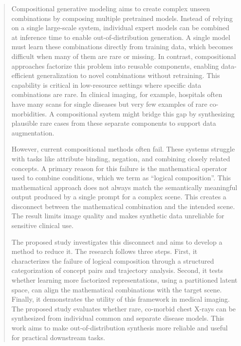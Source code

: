 
\begin{abstract}
Compositional generative modeling aims to create complex unseen combinations by composing multiple pretrained models. 
Instead of relying on a single large-scale system, individual expert models can be combined at inference time to enable out-of-distribution generation. 
A single model must learn these combinations directly from training data, which becomes difficult when many of them are rare or missing.
In contrast, compositional approaches factorize this problem into reusable components, enabling data-efficient generalization to novel combinations without retraining.
This capability is critical in low-resource settings where specific data combinations are rare. 
In clinical imaging, for example, hospitals often have many scans for single diseases but very few examples of rare co-morbidities. 
A compositional system might bridge this gap by synthesizing plausible rare cases from these separate components to support data augmentation.

However, current compositional methods often fail. 
These systems struggle with tasks like attribute binding, negation, and combining closely related concepts. 
A primary reason for this failure is the mathematical operator used to combine conditions, which we term as ``logical composition''. 
This mathematical approach does not always match the semantically meaningful output produced by a single prompt for a complex scene. 
This creates a disconnect between the mathematical combination and the intended scene. 
The result limits image quality and makes synthetic data unreliable for sensitive clinical use.

The proposed study investigates this disconnect and aims to develop a method to reduce it. 
The research follows three steps. First, it characterizes the failure of logical composition through a structured categorization of concept pairs and trajectory analysis. 
Second, it tests whether learning more factorized representations, using a partitioned latent space, can align the mathematical combinations with the target scene. 
Finally, it demonstrates the utility of this framework in medical imaging. The proposed study evaluates whether rare, co-morbid chest X-rays can be synthesized from individual common and separate disease models. 
This work aims to make out-of-distribution synthesis more reliable and useful for practical downstream tasks.
\end{abstract}
